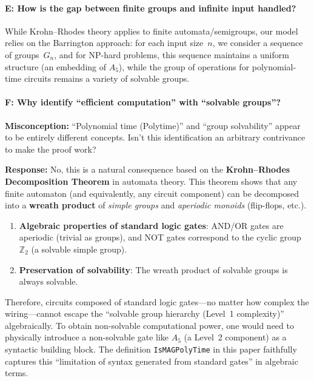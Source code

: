 \documentclass[11pt,a4paper]{article}
\theoremstyle{plain}
\theoremstyle{definition}
\newcommand{\Aalt}{A_5}
\newcommand{\lean}[1]{\texttt{#1}}
\begin{document}
\paragraph{E: How is the gap between finite groups and infinite input handled?}
While Krohn--Rhodes theory applies to finite automata/semigroups, our model relies on the Barrington approach: for each input size~$n$, we consider a sequence of groups~$G_n$, and for NP-hard problems, this sequence maintains a uniform structure (an embedding of $\Aalt$), while the group of operations for polynomial-time circuits remains a variety of solvable groups.


\paragraph{F: Why identify ``efficient computation'' with ``solvable groups''?}
\textbf{Misconception:} ``Polynomial time (Polytime)'' and ``group solvability'' appear to be entirely different concepts. Isn't this identification an arbitrary contrivance to make the proof work?

\textbf{Response:} No, this is a natural consequence based on the \textbf{Krohn--Rhodes Decomposition Theorem} in automata theory. This theorem shows that any finite automaton (and equivalently, any circuit component) can be decomposed into a \textbf{wreath product} of \emph{simple groups} and \emph{aperiodic monoids} (flip-flops, etc.).

\begin{enumerate}[nosep]
\item \textbf{Algebraic properties of standard logic gates}: AND/OR gates are aperiodic (trivial as groups), and NOT gates correspond to the cyclic group $\mathbb{Z}_2$ (a solvable simple group).
\item \textbf{Preservation of solvability}: The wreath product of solvable groups is always solvable.
\end{enumerate}

Therefore, circuits composed of standard logic gates---no matter how complex the wiring---cannot escape the ``solvable group hierarchy (Level~1 complexity)'' algebraically. To obtain non-solvable computational power, one would need to physically introduce a non-solvable gate like $\Aalt$ (a Level~2 component) as a syntactic building block. The definition \lean{IsMAGPolyTime} in this paper faithfully captures this ``limitation of syntax generated from standard gates'' in algebraic terms.
\end{document}
